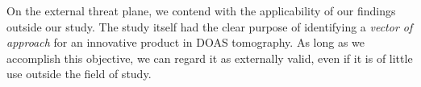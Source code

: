 On the external threat plane, we contend with the applicability of our
findings outside our study. The study itself had the clear purpose of
identifying a \emph{vector of approach} for an innovative product in
DOAS tomography. As long as we accomplish this objective, we can regard
it as externally valid, even if it is of little use outside the field of
study.

